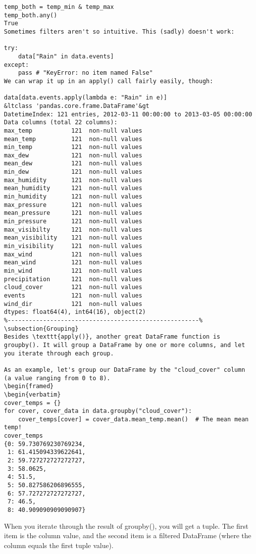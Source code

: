 \begin{framed}
\begin{verbatim}
temp_both = temp_min & temp_max
temp_both.any()
True
Sometimes filters aren't so intuitive. This (sadly) doesn't work:

try:
    data["Rain" in data.events]
except:
    pass # "KeyError: no item named False"
We can wrap it up in an apply() call fairly easily, though:

data[data.events.apply(lambda e: "Rain" in e)]
&ltclass 'pandas.core.frame.DataFrame'&gt
DatetimeIndex: 121 entries, 2012-03-11 00:00:00 to 2013-03-05 00:00:00
Data columns (total 22 columns):
max_temp           121  non-null values
mean_temp          121  non-null values
min_temp           121  non-null values
max_dew            121  non-null values
mean_dew           121  non-null values
min_dew            121  non-null values
max_humidity       121  non-null values
mean_humidity      121  non-null values
min_humidity       121  non-null values
max_pressure       121  non-null values
mean_pressure      121  non-null values
min_pressure       121  non-null values
max_visibilty      121  non-null values
mean_visibility    121  non-null values
min_visibility     121  non-null values
max_wind           121  non-null values
mean_wind          121  non-null values
min_wind           121  non-null values
precipitation      121  non-null values
cloud_cover        121  non-null values
events             121  non-null values
wind_dir           121  non-null values
dtypes: float64(4), int64(16), object(2)
%------------------------------------------------------%
\subsection{Grouping}
Besides \texttt{apply()}, another great DataFrame function is groupby(). It will group a DataFrame by one or more columns, and let you iterate through each group.

As an example, let's group our DataFrame by the "cloud_cover" column (a value ranging from 0 to 8).
\begin{framed}
\begin{verbatim}
cover_temps = {}
for cover, cover_data in data.groupby("cloud_cover"):
    cover_temps[cover] = cover_data.mean_temp.mean()  # The mean mean temp!
cover_temps
{0: 59.730769230769234,
 1: 61.415094339622641,
 2: 59.727272727272727,
 3: 58.0625,
 4: 51.5,
 5: 50.827586206896555,
 6: 57.727272727272727,
 7: 46.5,
 8: 40.909090909090907}
\end{verbatim}
\end{framed}
When you iterate through the result of groupby(), you will get a tuple. The first item is the column value, and the second item is a filtered DataFrame (where the column equals the first tuple value).

